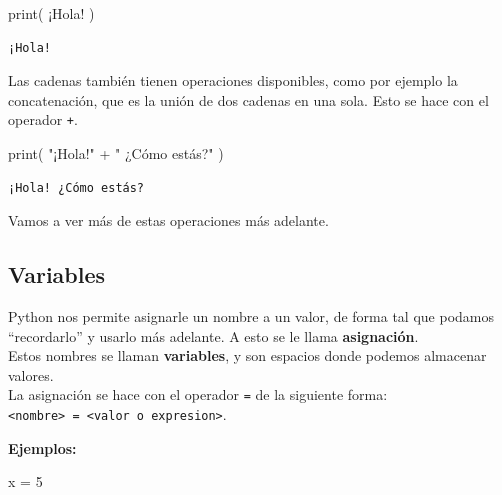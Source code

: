 \documentclass[
  letterpaper,
  DIV=11,
  numbers=noendperiod]{scrreprt}
\newenvironment{Shaded}{\begin{snugshade}}{\end{snugshade}}
\newcommand{\BuiltInTok}[1]{\textcolor[rgb]{0.00,0.23,0.31}{#1}}
\newcommand{\DecValTok}[1]{\textcolor[rgb]{0.68,0.00,0.00}{#1}}
\newcommand{\NormalTok}[1]{\textcolor[rgb]{0.00,0.23,0.31}{#1}}
\newcommand{\OperatorTok}[1]{\textcolor[rgb]{0.37,0.37,0.37}{#1}}
\newcommand{\StringTok}[1]{\textcolor[rgb]{0.13,0.47,0.30}{#1}}
\begin{document}
\begin{Shaded}
\begin{Highlighting}[]
\BuiltInTok{print}\NormalTok{( }\StringTok{\textquotesingle{}¡Hola!\textquotesingle{}}\NormalTok{ )}
\end{Highlighting}
\end{Shaded}

\begin{verbatim}
¡Hola!
\end{verbatim}

Las cadenas también tienen operaciones disponibles, como por ejemplo la
concatenación, que es la unión de dos cadenas en una sola. Esto se hace
con el operador \texttt{+}.

\begin{Shaded}
\begin{Highlighting}[]
\BuiltInTok{print}\NormalTok{( }\StringTok{"¡Hola!"} \OperatorTok{+} \StringTok{" ¿Cómo estás?"}\NormalTok{ )}
\end{Highlighting}
\end{Shaded}

\begin{verbatim}
¡Hola! ¿Cómo estás?
\end{verbatim}

Vamos a ver más de estas operaciones más adelante.

\hypertarget{variables}{%
\subsection{Variables}\label{variables}}

Python nos permite asignarle un nombre a un valor, de forma tal que
podamos ``recordarlo'' y usarlo más adelante. A esto se le llama
\textbf{asignación}.\\
Estos nombres se llaman \textbf{variables}, y son espacios donde podemos
almacenar valores.\\

La asignación se hace con el operador \texttt{=} de la siguiente forma:
\texttt{\textless{}nombre\textgreater{}\ =\ \textless{}valor\ o\ expresion\textgreater{}}.

\textbf{Ejemplos:}

\begin{Shaded}
\begin{Highlighting}[]
\NormalTok{x }\OperatorTok{=} \DecValTok{5}
\end{Highlighting}
\end{Shaded}
\end{document}
